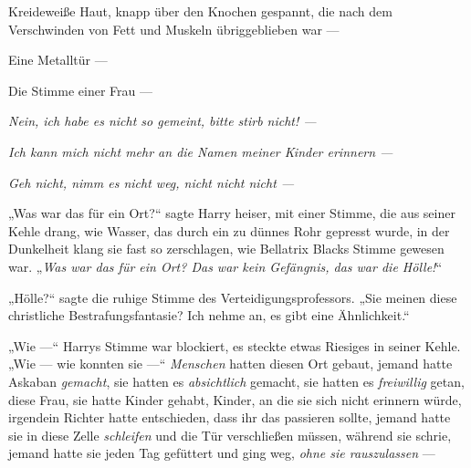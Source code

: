 Kreideweiße Haut, knapp über den Knochen gespannt, die nach dem Verschwinden von Fett und Muskeln übriggeblieben war —

Eine Metalltür —

Die Stimme einer Frau —

\emph{Nein, ich habe es nicht so gemeint, bitte stirb nicht! —}

\emph{Ich kann mich nicht mehr an die Namen meiner Kinder erinnern —}

\emph{Geh nicht, nimm es nicht weg, nicht nicht nicht —}

„Was war das für ein Ort?“ sagte Harry heiser, mit einer Stimme, die aus seiner Kehle drang, wie Wasser, das durch ein zu dünnes Rohr gepresst wurde, in der Dunkelheit klang sie fast so zerschlagen, wie Bellatrix Blacks Stimme gewesen war.
„\emph{Was war das für ein Ort? Das war kein Gefängnis, das war die Hölle!}“

„Hölle?“ sagte die ruhige Stimme des Verteidigungsprofessors.
„Sie meinen diese christliche Bestrafungsfantasie? Ich nehme an, es gibt eine Ähnlichkeit.“

„Wie —“ Harrys Stimme war blockiert, es steckte etwas Riesiges in seiner Kehle.
„Wie — wie konnten sie —“ \emph{Menschen} hatten diesen Ort gebaut, jemand hatte Askaban \emph{gemacht}, sie hatten es \emph{absichtlich} gemacht, sie hatten es \emph{freiwillig} getan, diese Frau, sie hatte Kinder gehabt, Kinder, an die sie sich nicht erinnern würde, irgendein Richter hatte entschieden, dass ihr das passieren sollte, jemand hatte sie in diese Zelle \emph{schleifen} und die Tür verschließen müssen, während sie schrie, jemand hatte sie jeden Tag gefüttert und ging weg, \emph{ohne sie rauszulassen} —

